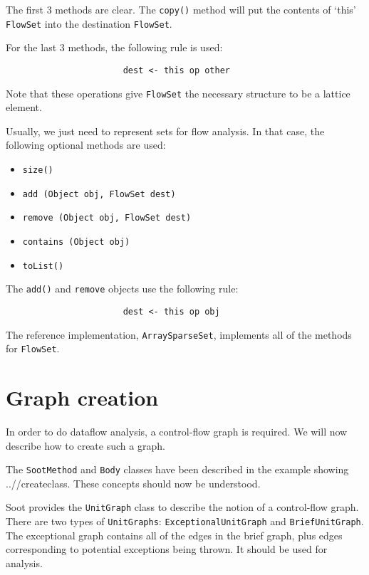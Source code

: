 \documentclass{article}
\begin{document}
The first 3 methods are clear.  The {\tt copy()} method
will put the contents of `this' {\tt FlowSet} into the
destination {\tt FlowSet}.  

For the last 3 methods, the following rule is used:

\begin{verbatim}
                       dest <- this op other
\end{verbatim}

Note that these operations give {\tt FlowSet} the necessary
structure to be a lattice element.  

Usually, we just need to represent sets for flow analysis.  In that
case, the following optional methods are used:
\begin{itemize}
\item {\tt size()}
\item {\tt add (Object obj, FlowSet dest)}
\item {\tt remove (Object obj, FlowSet dest)}
\item {\tt contains (Object obj)}
\item {\tt toList()}
\end{itemize}

The {\tt add()} and {\tt remove} objects use the following rule:

\begin{verbatim}
                       dest <- this op obj
\end{verbatim}

The reference implementation, {\tt ArraySparseSet}, implements all
of the methods for {\tt FlowSet}.

\section{Graph creation}

In order to do dataflow analysis, a control-flow graph is required.
We will now describe how to create such a graph.

The {\tt SootMethod} and {\tt Body} classes have been described in the
example showing 
{..//createclass}.
These concepts should now be understood.  

Soot provides the {\tt UnitGraph} class to describe the notion of
a control-flow graph.  There are two types of {\tt UnitGraphs}:
{\tt ExceptionalUnitGraph} and {\tt BriefUnitGraph}.  The exceptional graph
contains all of the edges in the brief graph, plus edges corresponding
to potential exceptions being thrown.  It should be used for analysis.
\end{document}
